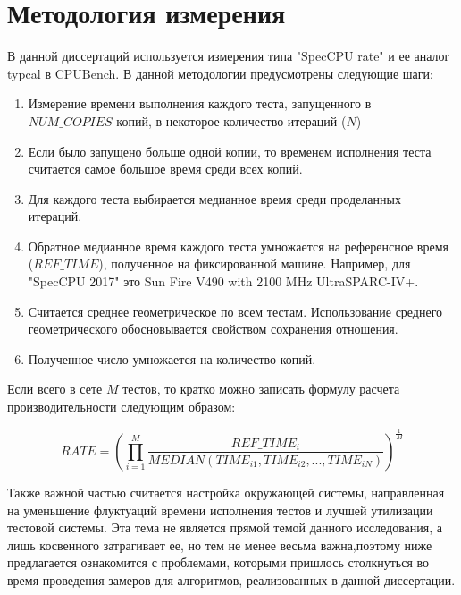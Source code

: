 \section{Методология измерения}\label{p1:method}
В данной диссертаций используется измерения типа  "SpecCPU rate"\phantom{} и ее аналог typcal в CPUBench. В данной методологии предусмотрены следующие шаги:
\begin{enumerate} 
		\item Измерение времени выполнения каждого теста, запущенного в $NUM\_COPIES$ копий, в некоторое количество итераций ($N$)
		\item Если было запущено больше одной копии, то временем исполнения теста считается самое большое время среди всех копий.
		\item Для каждого теста выбирается медианное время среди проделанных итераций. 
		\item Обратное медианное время каждого теста умножается на референсное время ($REF\_TIME$), полученное на фиксированной машине. Например, для "SpecCPU 2017"\phantom{} это  Sun Fire V490 with 2100 MHz UltraSPARC-IV+.
		\item Считается среднее геометрическое по всем тестам. Использование среднего геометрического обосновывается свойством сохранения отношения.
		\item Полученное число умножается на количество копий.
\end{enumerate}
Если всего в сете $M$ тестов, то кратко можно записать формулу расчета производительности следующим образом:

$$RATE =\left(\prod _{i=1}^{M}\dfrac{REF\_TIME_i}{MEDIAN(TIME_{i1}, TIME_{i2}, ... , TIME_{iN})}\right)^{\frac {1}{M}} $$

Также важной частью считается настройка окружающей системы, направленная на уменьшение флуктуаций времени исполнения тестов и лучшей утилизации тестовой системы.
Эта тема не является прямой темой данного исследования, а лишь косвенного затрагивает ее, но тем не менее весьма важна,поэтому ниже предлагается ознакомится с проблемами, которыми пришлось столкнуться во  время проведения замеров для алгоритмов, реализованных в данной диссертации.  

